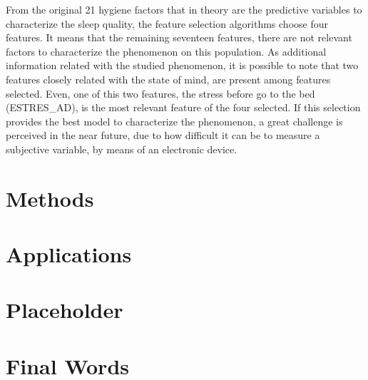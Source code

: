 \documentclass[]{book}
\begin{document}
From the original 21 hygiene factors that in theory are the predictive
variables to characterize the sleep quality, the feature selection
algorithms choose four features. It means that the remaining seventeen
features, there are not relevant factors to characterize the phenomenon
on this population. As additional information related with the studied
phenomenon, it is possible to note that two features closely related
with the state of mind, are present among features selected. Even, one
of this two features, the stress before go to the bed (ESTRES\_AD), is
the most relevant feature of the four selected. If this selection
provides the best model to characterize the phenomenon, a great
challenge is perceived in the near future, due to how difficult it can
be to measure a subjective variable, by means of an electronic device.

\chapter{Methods}\label{methods}

\chapter{Applications}\label{applications}

\chapter{Placeholder}\label{placeholder}

\chapter{Final Words}\label{final-words}


\end{document}

